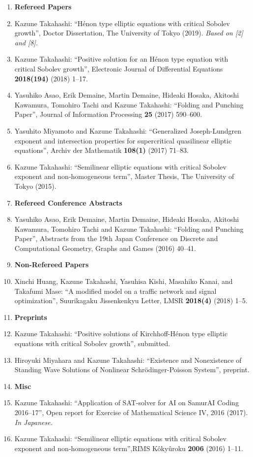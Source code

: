 \begin{enumerate}
  \item[] {\bf Refereed Papers}
  \item Kazune Takahashi: ``Hénon type elliptic equations with critical Sobolev growth'', Doctor Dissertation, The University of Tokyo (2019). {\it Based on [2] and [8].}
  \item Kazune Takahashi: ``Positive solution for an Hénon type equation with critical Sobolev growth'', Electronic Journal of Differential Equations {\bf 2018(194)} (2018) 1--17.
  \item Yasuhiko Asao, Erik Demaine, Martin Demaine, Hideaki Hosaka, Akitoshi Kawamura, Tomohiro Tachi and Kazune Takahashi: ``Folding and Punching Paper'', Journal of Information Processing {\bf 25} (2017) 590--600.
  \item Yasuhito Miyamoto and Kazune Takahashi: ``Generalized Joseph-Lundgren exponent and intersection properties for supercritical quasilinear elliptic equations'', Archiv der Mathematik {\bf 108(1)} (2017) 71--83.
  \item Kazune Takahashi: ``Semilinear elliptic equations with critical Sobolev exponent and non-homogeneous term'', Master Thesis, The University of Tokyo (2015).
  \item[] {\bf Refereed Conference Abstracts}
  \item Yasuhiko Asao, Erik Demaine, Martin Demaine, Hideaki Hosaka, Akitoshi Kawamura, Tomohiro Tachi and Kazune Takahashi: ``Folding and Punching Paper'', Abstracts from the 19th Japan Conference on Discrete and Computational Geometry, Graphs and Games (2016) 40--41.
  \item[] {\bf Non-Refereed Papers}
  \item Xinchi Huang, Kazune Takahashi, Yasuhisa Kishi, Masahiko Kanai, and Takafumi Mase: ``A modified model on a traffic network and signal optimization'', Suurikagaku Jissenkenkyu Letter, LMSR {\bf 2018(4)} (2018) 1--5.
  \item[] {\bf Preprints}
  \item Kazune Takahashi: ``Positive solutions of Kirchhoff-Hénon type elliptic equations with critical Sobolev growth'', submitted.
  \item Hiroyuki Miyahara and Kazune Takahashi: ``Existence and Nonexistence of Standing Wave Solutions of Nonlinear Schr\"{o}dinger-Poisson System'', preprint.
  \item[] {\bf Misc}
  \item Kazune Takahashi: ``Application of SAT-solver for AI on SamurAI Coding 2016--17'', Open report for Exercise of Mathematical Science IV, 2016 (2017). {\it In Japanese.}
  \item Kazune Takahashi: ``Semilinear elliptic equations with critical Sobolev exponent and non-homogeneous term'',RIMS K\^{o}ky\^{u}roku {\bf 2006} (2016) 1--11.
\end{enumerate}

